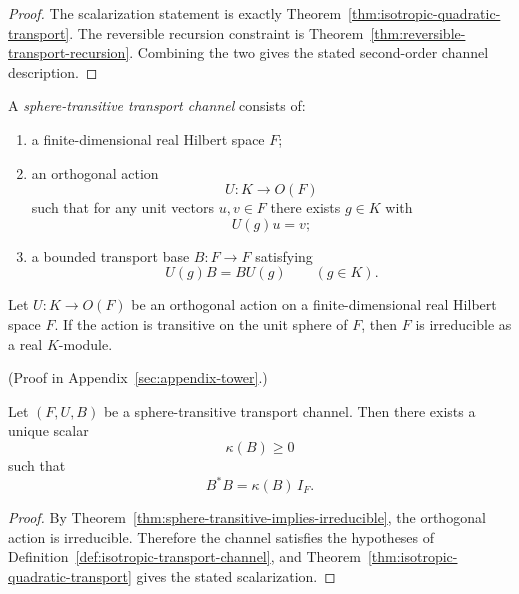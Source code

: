 \begin{proof}
The scalarization statement is exactly
Theorem~\ref{thm:isotropic-quadratic-transport}. The reversible recursion
constraint is Theorem~\ref{thm:reversible-transport-recursion}. Combining the
two gives the stated second-order channel description.
\end{proof}

\begin{definition}
\label{def:sphere-transitive-transport-channel}
A \emph{sphere-transitive transport channel} consists of:
\begin{enumerate}[label=(\roman*), leftmargin=2em, itemsep=0.2em]
\item a finite-dimensional real Hilbert space $F$;
\item an orthogonal action
      \[
      U:K\to O(F)
      \]
      such that for any unit vectors $u,v\in F$ there exists $g\in K$ with
      \[
      U(g)u=v;
      \]
\item a bounded transport base $B:F\to F$ satisfying
      \[
      U(g)B=BU(g)
      \qquad(g\in K).
      \]
\end{enumerate}
\end{definition}

\begin{theorem}
\label{thm:sphere-transitive-implies-irreducible}
Let $U:K\to O(F)$ be an orthogonal action on a finite-dimensional real Hilbert
space $F$. If the action is transitive on the unit sphere of $F$, then $F$ is
irreducible as a real $K$-module.
\end{theorem}

(Proof in Appendix~\ref{sec:appendix-tower}.)

\begin{corollary}
\label{cor:sphere-transitive-quadratic-transport}
Let $(F,U,B)$ be a sphere-transitive transport channel. Then there exists a
unique scalar
\[
\kappa(B)\ge 0
\]
such that
\[
B^*B=\kappa(B)\,I_F.
\]
\end{corollary}

\begin{proof}
By Theorem~\ref{thm:sphere-transitive-implies-irreducible}, the orthogonal
action is irreducible. Therefore the channel satisfies the hypotheses of
Definition~\ref{def:isotropic-transport-channel}, and
Theorem~\ref{thm:isotropic-quadratic-transport} gives the stated scalarization.
\end{proof}

